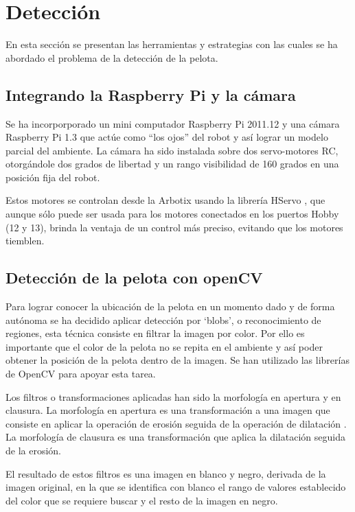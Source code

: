\documentclass[conference, letterpaper]{IEEEtranMC1}
\begin{document}
\section{Detección}
\label{sec:deteccion}


En esta sección se presentan las herramientas y estrategias con las cuales se ha abordado el problema de la detección de la pelota.

\subsection{Integrando la Raspberry Pi y la cámara}
Se ha incorporporado un mini computador Raspberry Pi 2011.12 y una cámara Raspberry Pi 1.3 que actúe como “los ojos” del robot y así lograr un modelo parcial del ambiente. La cámara ha sido instalada sobre dos servo-motores RC, otorgándole dos grados de libertad y un rango visibilidad de 160 grados en una posición fija del robot.

Estos motores se controlan desde la Arbotix usando la librería HServo \cite{vanadium}, que aunque sólo puede ser usada para los motores conectados en los puertos Hobby (12 y 13), brinda la ventaja de un control más preciso, evitando que los motores tiemblen. 
 

\subsection{Detección de la pelota con openCV}
Para lograr conocer la ubicación de la pelota en un momento dado y de forma autónoma se ha decidido aplicar detección por ‘blobs’, o reconocimiento de regiones, esta técnica consiste en filtrar la imagen por color. Por ello es importante que el color de la pelota no se repita en el ambiente y así poder obtener la posición de la pelota dentro de la imagen. Se han utilizado las librerías de OpenCV para apoyar esta tarea.

Los filtros o transformaciones aplicadas han sido la morfología en apertura y en clausura. La morfología en apertura es una transformación a una imagen que consiste en aplicar la operación de erosión seguida de la operación de dilatación \cite{filtros}. La morfología de clausura es una transformación que aplica la dilatación seguida de la erosión.


El resultado de estos filtros es una imagen en blanco y negro, derivada de la imagen original, en la que se identifica con blanco el rango de valores establecido del color que se requiere buscar y el resto de la imagen en negro. 
\end{document}
